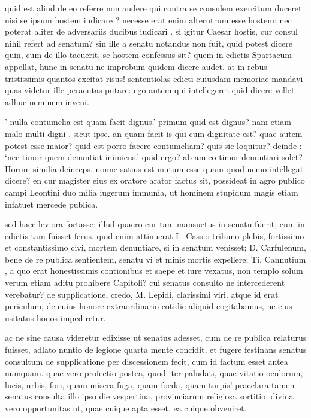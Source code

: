  quid est aliud de eo referre non audere qui contra se consulem exercitum duceret nisi se ipsum hostem iudicare ? necesse erat enim alterutrum esse hostem; nec poterat aliter de adversariis ducibus iudicari . si igitur Caesar hostis, cur consul nihil refert ad senatum? sin ille a senatu notandus non fuit, quid potest dicere quin, cum de illo tacuerit, se hostem confessus sit? quem in edictis Spartacum appellat, hunc in senatu ne improbum quidem dicere audet. at in rebus tristissimis quantos excitat risus! sententiolas edicti cuiusdam memoriae mandavi quas videtur ille peracutas putare: ego autem qui intellegeret quid dicere vellet adhuc neminem inveni.

 ' nulla contumelia est quam facit dignus.' primum quid est dignus? nam etiam malo multi digni , sicut ipse. an quam facit is qui cum dignitate est? quae autem potest esse maior? quid est porro facere contumeliam? quis sic loquitur? deinde : `nec timor quem denuntiat inimicus.' quid ergo? ab amico timor denuntiari solet? Horum similia deinceps. nonne satius est mutum esse quam quod nemo intellegat dicere? en cur magister eius ex oratore arator factus sit, possideat in agro publico campi Leontini duo milia iugerum immunia, ut hominem stupidum magis etiam infatuet mercede publica.

 sed haec leviora fortasse: illud quaero cur tam mansuetus in senatu fuerit, cum in edictis tam fuisset ferus. quid enim attinuerat L. Cassio tribuno plebis, fortissimo et constantissimo civi, mortem denuntiare, si in senatum venisset; D. Carfulenum, bene de re publica sentientem, senatu vi et minis mortis expellere; Ti. Cannutium , a quo erat honestissimis contionibus et saepe et iure vexatus, non templo solum verum etiam aditu prohibere Capitoli? cui senatus consulto ne intercederent verebatur? de supplicatione, credo, M. Lepidi, clarissimi viri. atque id erat periculum, de cuius honore extraordinario cotidie aliquid cogitabamus, ne eius usitatus honos impediretur.

 ac ne sine causa videretur edixisse ut senatus adesset, cum de re publica relaturus fuisset, adlato nuntio de legione quarta mente concidit, et fugere festinans senatus consultum de supplicatione per discessionem fecit, cum id factum esset antea numquam. quae vero profectio postea, quod iter paludati, quae vitatio oculorum, lucis, urbis, fori, quam misera fuga, quam foeda, quam turpis! praeclara tamen senatus consulta illo ipso die vespertina, provinciarum religiosa sortitio, divina vero opportunitas ut, quae cuique apta esset, ea cuique obveniret.

